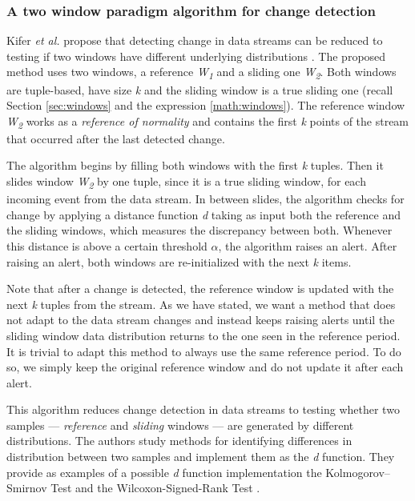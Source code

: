 \subsubsection{A two window paradigm algorithm for change detection}
Kifer \emph{et al.} propose that detecting change in data streams can be reduced to testing if two windows have different underlying distributions \cite{Kifer-Detecting-Change}. The proposed method uses two windows, a reference \textit{W\textsubscript{1}} and a sliding one \textit{W\textsubscript{2}}. Both windows are tuple-based, have size \textit{k} and the sliding window is a true sliding one (recall Section \ref{sec:windows} and the expression \ref{math:windows}). The reference window \textit{W\textsubscript{2}} works as a \textit{reference of normality} and contains the first \textit{k} points of the stream that occurred after the last detected change.

The algorithm begins by filling both windows with the first \textit{k} tuples. Then it slides window \textit{W\textsubscript{2}} by one tuple, since it is a true sliding window, for each incoming event from the data stream. In between slides, the algorithm checks for change by applying a distance function \textit{d} taking as input both the reference and the sliding windows, which measures the discrepancy between both. Whenever this distance is above a certain threshold $\alpha$, the algorithm raises an alert. After raising an alert, both windows are re-initialized with the next \textit{k} items.

Note that after a change is detected, the reference window is updated with the next \textit{k} tuples from the stream. As we have stated, we want a method that does not adapt to the data stream changes and instead keeps raising alerts until the sliding window data distribution returns to the one seen in the reference period. It is trivial to adapt this method to always use the same reference period. To do so, we simply keep the original reference window and do not update it after each alert.

This algorithm reduces change detection in data streams to testing whether two samples --- \textit{reference} and \textit{sliding} windows --- are generated by different distributions. The authors study methods for identifying differences in distribution between two samples and implement them as the \textit{d} function. They provide as examples of a possible \textit{d} function implementation the  Kolmogorov–Smirnov Test \cite{Kolmogorov-Smirnov} and the Wilcoxon-Signed-Rank Test \cite{Wilcoxon}.

